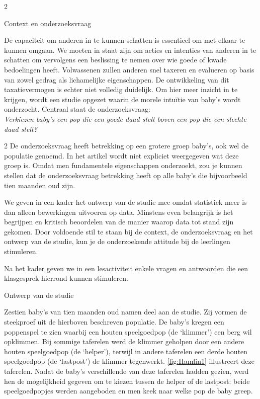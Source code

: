 \begin{multicols}{2}
\begin{kader}{}{Context en onderzoeksvraag}

De capaciteit om anderen in te kunnen schatten is essentieel om met elkaar te kunnen omgaan. We moeten in staat zijn om acties en intenties van anderen in te schatten om vervolgens een beslissing te nemen over wie goede of kwade bedoelingen heeft. Volwassenen zullen anderen snel taxeren en evalueren op basis van zowel gedrag als lichamelijke eigenschappen. De ontwikkeling van dit taxatievermogen is echter niet volledig duidelijk. Om hier meer inzicht in te krijgen, wordt een studie opgezet waarin de morele intuïtie van baby's wordt onderzocht. Centraal staat de onderzoeksvraag:
\vspace{.2cm}
\\
\emph{Verkiezen baby's een pop die een goede daad stelt boven een pop die een slechte daad stelt?}
\end{kader}
\end{multicols}
\begin{multicols}{2}
De onderzoeksvraag heeft betrekking op een grotere groep baby's, ook wel de populatie genoemd. In het artikel wordt niet expliciet weergegeven wat deze groep is. Omdat men fundamentele eigenschappen onderzoekt, zou je kunnen stellen dat de onderzoeksvraag betrekking heeft op alle baby's die bijvoorbeeld tien maanden oud zijn.

We geven in een kader het ontwerp van de studie mee omdat statistiek meer is dan alleen bewerkingen uitvoeren op data. Minstens even belangrijk is het begrijpen en kritisch beoordelen van de manier waarop data tot stand zijn gekomen. Door voldoende stil te staan bij de context, de onderzoeksvraag en het ontwerp van de studie, kun je de onderzoekende attitude bij de leerlingen stimuleren. 

Na het kader geven we in een lesactiviteit enkele vragen en antwoorden die een klasgesprek hierrond kunnen stimuleren.

\begin{kader}{}{Ontwerp van de studie}

Zestien baby's van tien maanden oud namen deel aan de studie. Zij vormen de steekproef uit de hierboven beschreven populatie. De baby's kregen een poppenspel te zien waarbij een houten speelgoedpop (de `klimmer') een berg wil opklimmen. Bij sommige taferelen werd de klimmer geholpen door een andere houten speelgoedpop (de `helper'), terwijl in andere taferelen een derde houten speelgoedpop (de `lastpost') de klimmer tegenwerkt. \autoref{fig:Hamlin1} illustreert deze taferelen. Nadat de baby's verschillende van deze taferelen hadden gezien, werd hen de mogelijkheid gegeven om te kiezen tussen de helper of de lastpost: beide speelgoedpopjes werden aangeboden en men keek naar welke pop de baby greep.
\end{kader} 

\end{multicols}

